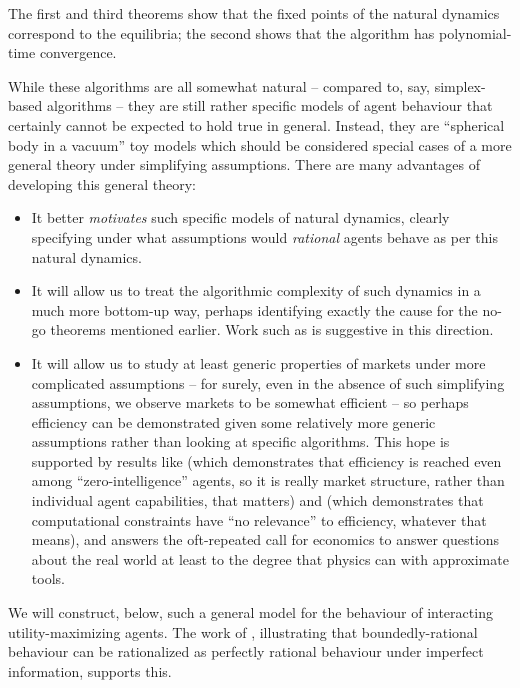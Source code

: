 \documentclass{article}
\begin{document}
The first and third theorems show that the fixed points of the natural dynamics correspond to the equilibria; the second shows that the algorithm has polynomial-time convergence.

While these algorithms are all somewhat natural -- compared to, say, simplex-based algorithms -- they are still rather specific models of agent behaviour that certainly cannot be expected to hold true in general. Instead, they are ``spherical body in a vacuum'' toy models which should be considered special cases of a more general theory under simplifying assumptions. There are many advantages of developing this general theory:

\begin{itemize}
    \item It better \emph{motivates} such specific models of natural dynamics, clearly specifying under what assumptions would \emph{rational} agents behave as per this natural dynamics.
    \item It will allow us to treat the algorithmic complexity of such dynamics in a much more bottom-up way, perhaps identifying exactly the cause for the no-go theorems mentioned earlier. Work such as \cite{chenthesis, norman} is suggestive in this direction.
    \item It will allow us to study at least generic properties of markets under more complicated assumptions -- for surely, even in the absence of such simplifying assumptions, we observe markets to be somewhat efficient -- so perhaps efficiency can be demonstrated given some relatively more generic assumptions rather than looking at specific algorithms. This hope is supported by results like \cite{gode} (which demonstrates that efficiency is reached even among ``zero-intelligence'' agents, so it is really market structure, rather than individual agent capabilities, that matters) and \cite{echenique} (which demonstrates that computational constraints have ``no relevance'' to efficiency, whatever that means), and answers the oft-repeated call for economics to answer questions about the real world at least to the degree that physics can with approximate tools.
\end{itemize}

We will construct, below, such a general model for the behaviour of interacting utility-maximizing agents. The work of \cite{br1, br2}, illustrating that boundedly-rational behaviour can be rationalized as perfectly rational behaviour under imperfect information, supports this.
\end{document}
